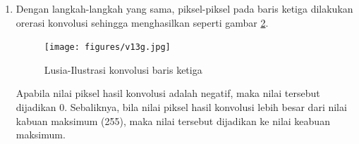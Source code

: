 \begin{enumerate}
\begin{enumerate}
\begin{itemize}
	\item Konvolusi pada gambar \ref{7A13f} dihitung dengan cara berikut :
	\par (0x5) + (-1x5) + (0x2) + (-1x6) + (4x6) + (-1x2) + (0x5) + (-1x5) + (0x3)    
	\par Sehingga didapat hasil konvolusi = 6 seperti pada gambar \ref{7A13f}.
		\begin{figure}[!hbtp]
		\centering
		\texttt{[image: figures/v13f.jpg]}
		\caption{Lusia-Ilustrasi konvolusi 6}
		\label{7A13f}
		\end{figure}
	\end{itemize}		
	\item Dengan langkah-langkah yang sama, piksel-piksel pada baris ketiga dilakukan orerasi konvolusi sehingga menghasilkan seperti gambar \ref{7A13g}.
		\begin{figure}[!hbtp]
		\centering
		\texttt{[image: figures/v13g.jpg]}
		\caption{Lusia-Ilustrasi konvolusi baris ketiga}
		\label{7A13g}
		\end{figure}
	\par Apabila nilai piksel hasil konvolusi adalah negatif, maka nilai tersebut dijadikan 0. Sebaliknya, bila nilai piksel hasil konvolusi lebih besar dari nilai kabuan maksimum (255), maka nilai tersebut dijadikan ke nilai keabuan maksimum.
	
	\end{enumerate}

\end{enumerate}

